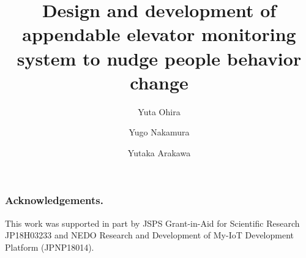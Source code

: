 \documentclass[runningheads]{llncs}
\begin{document}
\title{
  Design and development of appendable elevator monitoring system to nudge people behavior change
}

\author[1]{Yuta Ohira}
\author[1]{Yugo Nakamura}
\author[1]{Yutaka Arakawa}


\institute{}

\maketitle

\thispagestyle{fancy}








\subsubsection{Acknowledgements.}
This work was supported in part by JSPS Grant-in-Aid for Scientific Research JP18H03233 and NEDO Research and Development of My-IoT Development Platform (JPNP18014).

\thispagestyle{guusuu}

%
%
%

% 
% 


\thispagestyle{guusuu}
\end{document}
